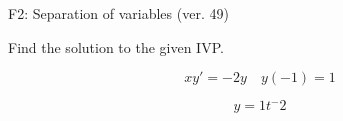 \begin{exercise}
  \begin{exerciseTitle}F2: Separation of variables (ver. 49)\end{exerciseTitle}
  \begin{exerciseStatement}
    
Find the solution to the given IVP.

    
\[xy'= -2 y \hspace{1em} y( -1 ) = 1\]

  \end{exerciseStatement}
  \begin{exerciseAnswer}
    
\[y= 1 t^ -2\]

  \end{exerciseAnswer}
\end{exercise}